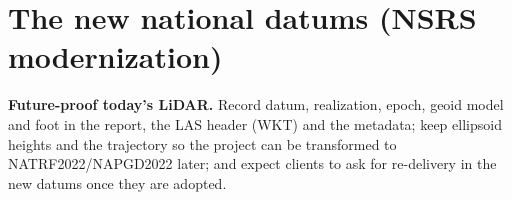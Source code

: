 \section{The new national datums (NSRS modernization)}\label{sec:nsrs}


\begin{tip}
\textbf{Future-proof today's LiDAR.} Record datum, realization, epoch, geoid model and foot in the report, the LAS header (WKT) and the metadata; keep ellipsoid heights and the trajectory so the project can be transformed to NATRF2022/NAPGD2022 later; and expect clients to ask for re-delivery in the new datums once they are adopted.
\end{tip}
